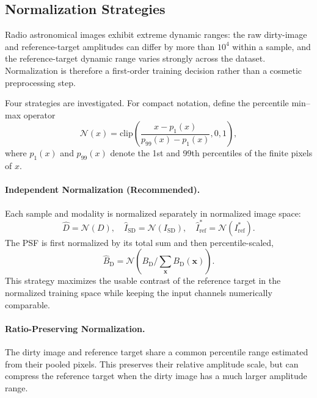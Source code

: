 \documentclass[twocolumn]{aastex631}
\begin{document}
\subsection{Normalization Strategies}
\label{sec:normalization}

Radio astronomical images exhibit extreme dynamic ranges: the raw dirty-image and reference-target amplitudes can differ by more than $10^4$ within a sample, and the reference-target dynamic range varies strongly across the dataset.
Normalization is therefore a first-order training decision rather than a cosmetic preprocessing step.

Four strategies are investigated.
For compact notation, define the percentile min--max operator
\begin{equation}
	\mathcal{N}(x) =
	\mathrm{clip}\left(\frac{x - p_1(x)}{p_{99}(x) - p_1(x)}, 0, 1\right),
\end{equation}
where $p_1(x)$ and $p_{99}(x)$ denote the 1st and 99th percentiles of the finite pixels of $x$.

\paragraph{Independent Normalization (Recommended).}
Each sample and modality is normalized separately in normalized image space:
\begin{equation}
	\hat{D}=\mathcal{N}(D), \quad
	\hat{I}_{\mathrm{SD}}=\mathcal{N}(I_{\mathrm{SD}}), \quad
	\hat{I}_{\mathrm{ref}}^*=\mathcal{N}(I_{\mathrm{ref}}^*).
\end{equation}
The PSF is first normalized by its total sum and then percentile-scaled,
\begin{equation}
	\hat{B}_{\mathrm{D}}=\mathcal{N}\left(B_{\mathrm{D}} / \sum_{\mathbf{x}} B_{\mathrm{D}}(\mathbf{x})\right).
\end{equation}
This strategy maximizes the usable contrast of the reference target in the normalized training space while keeping the input channels numerically comparable.

\paragraph{Ratio-Preserving Normalization.}
The dirty image and reference target share a common percentile range estimated from their pooled pixels.
This preserves their relative amplitude scale, but can compress the reference target when the dirty image has a much larger amplitude range.
\end{document}
